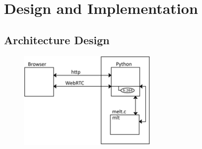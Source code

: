 \documentclass[12pt,a4paper]{article}
\begin{document}
\section{Design and Implementation} \label{section:design-implementation}







\subsection{Architecture Design}



\begin{figure}[H]
	\centering
	\includegraphics[width=0.6\textwidth]{IM2.png}
\end{figure}
\end{document}
